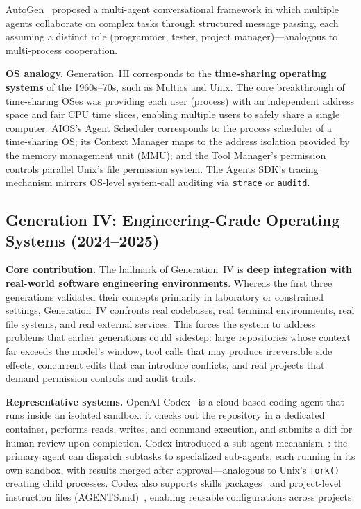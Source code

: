 \documentclass[11pt,a4paper]{article}
\begin{document}
AutoGen~\cite{wu2023autogen} proposed a multi-agent conversational framework in which multiple agents collaborate on complex tasks through structured message passing, each assuming a distinct role (programmer, tester, project manager)---analogous to multi-process cooperation.

\textbf{OS analogy.}
Generation~III corresponds to the \textbf{time-sharing operating systems} of the 1960s--70s, such as Multics and Unix.
The core breakthrough of time-sharing OSes was providing each user (process) with an independent address space and fair CPU time slices, enabling multiple users to safely share a single computer.
AIOS's Agent Scheduler corresponds to the process scheduler of a time-sharing OS; its Context Manager maps to the address isolation provided by the memory management unit (MMU); and the Tool Manager's permission controls parallel Unix's file permission system.
The Agents SDK's tracing mechanism mirrors OS-level system-call auditing via \texttt{strace} or \texttt{auditd}.

\subsection{Generation IV: Engineering-Grade Operating Systems (2024--2025)}

\textbf{Core contribution.}
The hallmark of Generation~IV is \textbf{deep integration with real-world software engineering environments}.
Whereas the first three generations validated their concepts primarily in laboratory or constrained settings, Generation~IV confronts real codebases, real terminal environments, real file systems, and real external services.
This forces the system to address problems that earlier generations could sidestep: large repositories whose context far exceeds the model's window, tool calls that may produce irreversible side effects, concurrent edits that can introduce conflicts, and real projects that demand permission controls and audit trails.

\textbf{Representative systems.}
OpenAI Codex~\cite{openai_codex_overview_2026} is a cloud-based coding agent that runs inside an isolated sandbox: it checks out the repository in a dedicated container, performs reads, writes, and command execution, and submits a diff for human review upon completion.
Codex introduced a sub-agent mechanism~\cite{openai_codex_subagents_2026}: the primary agent can dispatch subtasks to specialized sub-agents, each running in its own sandbox, with results merged after approval---analogous to Unix's \texttt{fork()} creating child processes.
Codex also supports skills packages~\cite{openai_codex_skills_2026} and project-level instruction files (AGENTS.md)~\cite{openai_codex_agents_md_2026}, enabling reusable configurations across projects.
\end{document}
